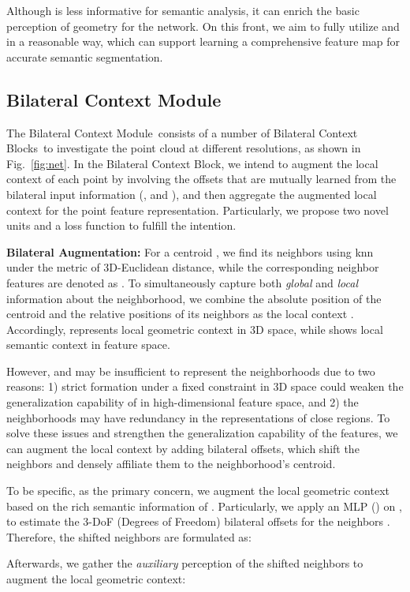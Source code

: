 \documentclass[10pt,twocolumn,letterpaper]{article}
\def\ourencoder{Bilateral Context Module}
\def\ourblock{Bilateral Context Block}
\def\ourblocks{Bilateral Context Blocks}
\begin{document}
Although  is less informative for semantic analysis, it can enrich the basic perception of geometry for the network. On this front, we aim to fully utilize  and  in a reasonable way, which can support learning a comprehensive feature map for accurate semantic segmentation.

\subsection{\ourencoder}
\label{sec:metho_cross}
The \ourencoder~consists of a number of \ourblocks~to investigate the point cloud at different resolutions, as shown in Fig.~\ref{fig:net}. In the \ourblock, we intend to augment the local context of each point by involving the offsets that are mutually learned from the bilateral input information (\ie,  and ), and then aggregate the augmented local context for the point feature representation. Particularly, we propose two novel units and a loss function to fulfill the intention.  

\vspace{1mm}
\noindent \textbf{Bilateral Augmentation:}
For a centroid , we find its neighbors  using knn under the metric of 3D-Euclidean distance, while the corresponding neighbor features are denoted as . To simultaneously capture both \emph{global} and \emph{local} information about the neighborhood, we combine the absolute position of the centroid and the relative positions of its neighbors as the local context . Accordingly,  represents local geometric context in 3D space, while  shows local semantic context in feature space.

However,  and  may be insufficient to represent the neighborhoods due to two reasons: 1) strict formation under a fixed constraint in 3D space could weaken the generalization capability of  in high-dimensional feature space, and 2) the  neighborhoods may have redundancy in the representations of close regions. To solve these issues and strengthen the generalization capability of the features, we can augment the local context by adding bilateral offsets, which shift the neighbors and densely affiliate them to the neighborhood's centroid.

To be specific, as the primary concern, we augment the local geometric context  based on the rich semantic information of . Particularly, we apply an MLP () on , to estimate the 3-DoF (Degrees of Freedom) bilateral offsets for the neighbors . Therefore, the shifted neighbors are formulated as:

Afterwards, we gather the \emph{auxiliary} perception of the shifted neighbors to augment the local geometric context:
\end{document}
